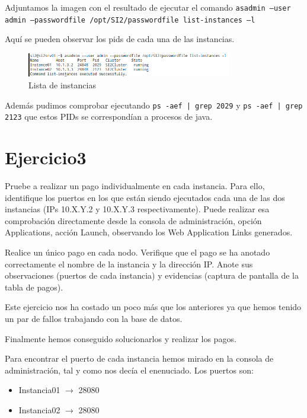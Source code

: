 \documentclass[a4paper, 10pt]{article}
\begin{document}
	Adjuntamos la imagen con  el resultado de ejecutar el comando \texttt{asadmin --user admin --passwordfile /opt/SI2/passwordfile list-instances –l}
 
 	Aquí se pueden observar los pids de cada una de las instancias.
 	\begin{figure}[hbtp]
 		\centering
 		\includegraphics[width=0.8\textwidth]{../../P3/pantallazos/ej2_listar_instancias.png}
 		\caption {Lista de instancias}
 	\end{figure}

 	Además pudimos comprobar ejecutando \texttt{ps -aef | grep 2029} y \texttt{ps -aef | grep 2123} que estos PIDs se correspondían a procesos de java. 

 \newpage
 \section{Ejercicio3}
 
 \begin{mdframed}
 	 Pruebe a realizar un pago individualmente en cada instancia. Para ello, identifique los
 	 puertos en los que están siendo ejecutados cada una de las dos instancias (IPs 10.X.Y.2 y 10.X.Y.3
 	 respectivamente). Puede realizar esa comprobación directamente desde la consola de administración,
 	 opción Applications, acción Launch, observando los Web Application Links generados.
 	 
 	 Realice un único pago en cada nodo. Verifique que el pago se ha anotado correctamente el nombre de la
 	 instancia y la dirección IP. Anote sus observaciones (puertos de cada instancia) y evidencias (captura de
 	 pantalla de la tabla de pagos). 
 \end{mdframed}
 
Este ejercicio nos ha costado un poco más que los anteriores ya que hemos tenido un par de fallos trabajando con la base de datos.

Finalmente hemos conseguido solucionarlos y realizar los pagos.

Para encontrar el puerto de cada instancia hemos mirado en la consola de administración, tal y como nos decía el enenuciado. Los puertos son:
\begin{itemize}
	\item Instancia01 $\rightarrow$ 28080
	\item Instancia02 $\rightarrow$ 28080
\end{itemize}
\end{document}
